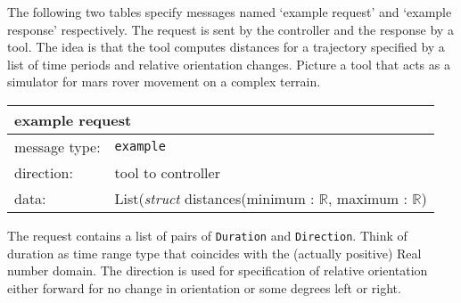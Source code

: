 \documentclass{article}
\newcommand{\msg}[1]{\texttt{#1}}
\newcommand{\Id}{\texttt{ID}\xspace}
\begin{document}

   The following two tables specify messages named `example request' and
   `example response' respectively. The request is sent by the controller and
   the response by a tool. The idea is that the tool computes distances for a
   trajectory specified by a list of time periods and relative orientation
   changes. Picture a tool that acts as a simulator for mars rover movement on
   a complex terrain.

   \begin{table}[H]
    \begin{center}
     \begin{tabular}{|ll|}
      \hline
       \multicolumn{2}{|l|}{\textbf{example request}} \\
      \hline
       message type:    & \msg{example} \\
      \hline
       direction:       & tool to controller \\
       data:            & List(\textit{struct } distances(minimum : $\mathbb{R}$, maximum : $\mathbb{R}$) \\
      \hline
     \end{tabular}
    \end{center}
    \vspace{-0.5cm}
   \end{table}

   \noindent The request contains a list of pairs of \texttt{Duration} and
   \texttt{Direction}. Think of duration as time range type that coincides
   with the (actually positive) Real number domain. The direction is used for
   specification of relative orientation either forward for no change in
   orientation or some degrees left or right.
\end{document}
